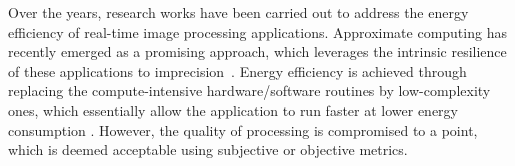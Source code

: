 \documentclass[journal]{IEEEtran}
\begin{document}
Over the years, research works have been carried out to address the energy efficiency of real-time image processing applications. Approximate computing has recently emerged as a promising approach, which leverages the intrinsic resilience of these applications to imprecision~\cite{han2013approximate,Mittal2013}. Energy efficiency is achieved through replacing the compute-intensive hardware\slash software routines by low-complexity ones, which essentially allow the application to run faster at lower energy consumption \cite{Duben2015}. However, the quality of processing is compromised to a point, which is deemed acceptable using subjective or objective metrics. 
\end{document}
